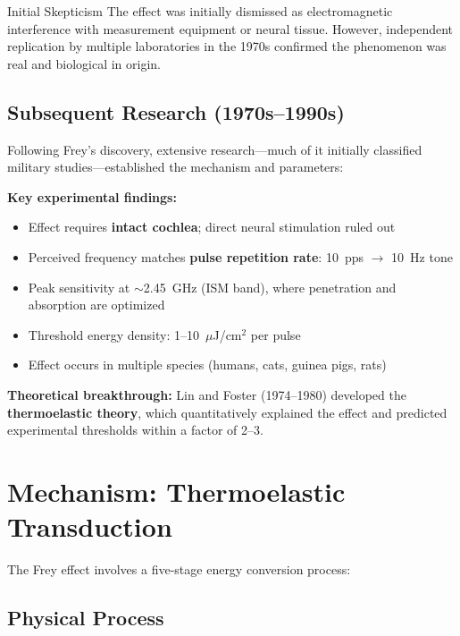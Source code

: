 \begin{calloutbox}{Initial Skepticism}
The effect was initially dismissed as electromagnetic interference with measurement equipment or neural tissue. However, independent replication by multiple laboratories in the 1970s confirmed the phenomenon was real and biological in origin.
\end{calloutbox}

\subsection{Subsequent Research (1970s--1990s)}

Following Frey's discovery, extensive research---much of it initially classified military studies---established the mechanism and parameters:

\textbf{Key experimental findings:}
\begin{itemize}
\item Effect requires \textbf{intact cochlea}; direct neural stimulation ruled out
\item Perceived frequency matches \textbf{pulse repetition rate}: 10~pps $\rightarrow$ 10~Hz tone
\item Peak sensitivity at $\sim$2.45~GHz (ISM band), where penetration and absorption are optimized
\item Threshold energy density: 1--10~$\mu$J/cm$^2$ per pulse
\item Effect occurs in multiple species (humans, cats, guinea pigs, rats)
\end{itemize}

\textbf{Theoretical breakthrough:} Lin and Foster (1974--1980) developed the \textbf{thermoelastic theory}, which quantitatively explained the effect and predicted experimental thresholds within a factor of 2--3.

\section{Mechanism: Thermoelastic Transduction}
\label{sec:frey-mechanism}

The Frey effect involves a five-stage energy conversion process:

\subsection{Physical Process}

